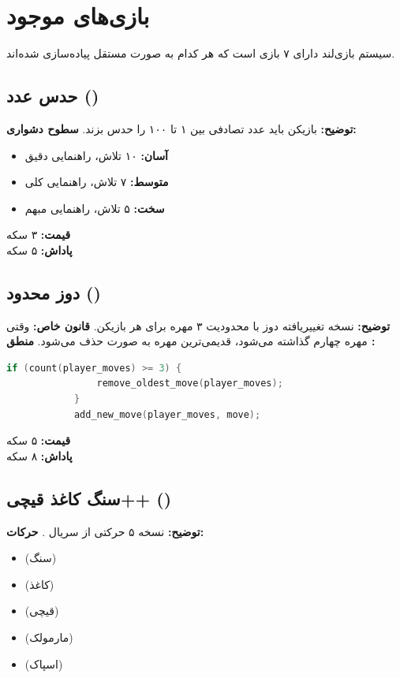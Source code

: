 \documentclass[12pt,a4paper]{article}
\begin{document}
	\newpage
	\section{بازی‌های موجود}
	
	سیستم بازی‌لند دارای ۷ بازی است که هر کدام به صورت مستقل پیاده‌سازی شده‌اند.
	
	\subsection{حدس عدد ()}
	\textbf{توضیح:} بازیکن باید عدد تصادفی بین ۱ تا ۱۰۰ را حدس بزند.
	\textbf{سطوح دشواری:}
	\begin{itemize}
		\item \textbf{آسان:} ۱۰ تلاش، راهنمایی دقیق
		\item \textbf{متوسط:} ۷ تلاش، راهنمایی کلی
		\item \textbf{سخت:} ۵ تلاش، راهنمایی مبهم
	\end{itemize}
	\textbf{قیمت:} ۳ سکه\\
	\textbf{پاداش:} ۵ سکه
	
	\subsection{دوز محدود ()}
	\textbf{توضیح:} نسخه تغییریافته دوز با محدودیت ۳ مهره برای هر بازیکن.
	\textbf{قانون خاص:} وقتی مهره چهارم گذاشته می‌شود، قدیمی‌ترین مهره به صورت  حذف می‌شود.
	\textbf{منطق :}
	\begin{latin}
		\begin{lstlisting}[language=C, caption=الگوریتم FIFO در دوز محدود]
			if (count(player_moves) >= 3) {
				remove_oldest_move(player_moves);
			}
			add_new_move(player_moves, move);
		\end{lstlisting}
	\end{latin}
	
	\textbf{قیمت:} ۵ سکه\\
	\textbf{پاداش:} ۸ سکه
	
	\subsection{سنگ کاغذ قیچی++ ()}
	\textbf{توضیح:} نسخه ۵ حرکتی از سریال .
	\textbf{حرکات:}
	\begin{itemize}
		\item {} (سنگ)
		\item {} (کاغذ)
		\item {} (قیچی)
		\item {} (مارمولک)
		\item {} (اسپاک)
	\end{itemize}
	
\end{document}
